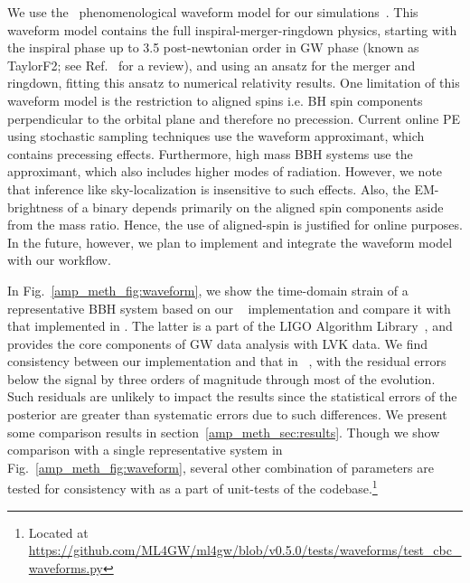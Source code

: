 \begin{refsection}
We use the \phenomd~phenomenological waveform model for our simulations~\cite{Khan:2015jqa}. 
This waveform model contains the full inspiral-merger-ringdown physics, starting with the inspiral phase up to 3.5 post-newtonian order in GW phase (known as TaylorF2; see Ref.~\cite{Buonanno_2009} for a review), and using an ansatz for the merger and ringdown, fitting this ansatz to numerical relativity results. 
One limitation of this waveform model is the restriction to aligned spins i.e. BH spin components perpendicular to the orbital plane and therefore no precession. 
Current online PE using stochastic sampling techniques use the {\phenomp} waveform approximant, which contains precessing effects. 
Furthermore, high mass BBH systems use the {\phenomxphm} approximant, which also includes higher modes of radiation. 
However, we note that inference like sky-localization is insensitive to such effects. 
Also, the EM-brightness of a binary depends primarily on the aligned spin components aside from the mass ratio. Hence, the use of aligned-spin is justified for online purposes. 
In the future, however, we plan to implement and integrate the {\phenomp} waveform model with our workflow.

In Fig.~\ref{amp_meth_fig:waveform}, we show the time-domain strain of a representative BBH system based on our \phenomd~ implementation and compare it with that implemented in \lalsim. 
The latter is a part of the LIGO Algorithm Library~\cite{lalsuite}, and provides the core components of GW data analysis with LVK data. 
We find consistency between our implementation and that in ~\lalsim, with the residual errors below the signal by three orders of magnitude through most of the evolution.
Such residuals are unlikely to impact the results since the statistical errors of the posterior are greater than systematic errors due to such differences. 
We present some comparison results in section~\ref{amp_meth_sec:results}.
Though we show comparison with a single representative system in Fig.~\ref{amp_meth_fig:waveform}, several other combination of parameters are tested for consistency with {\lalsim} as a part of unit-tests of the {\mlgw} codebase.\footnote{\scriptsize{Located at \url{https://github.com/ML4GW/ml4gw/blob/v0.5.0/tests/waveforms/test_cbc_waveforms.py}}}


\end{refsection}

